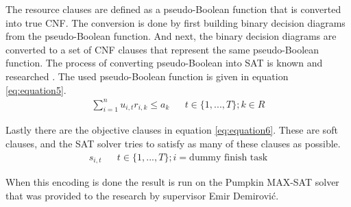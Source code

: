 The resource clauses are defined as a pseudo-Boolean function that is converted into true CNF. The conversion is done by first building binary decision diagrams from the pseudo-Boolean function. And next, the binary decision diagrams are converted to a set of CNF clauses that represent the same pseudo-Boolean function. The process of converting pseudo-Boolean into SAT is known and researched \cite{RN38}. The used pseudo-Boolean function is given in equation \ref{eq:equation5}.
\begin{align}\label{eq:equation5}
\sum^n_{i=1} u_{i,t}r_{i,k} \leq a_k    &&  t\in \{1,...,T\}; k\in R
\end{align}

Lastly there are the objective clauses in equation \ref{eq:equation6}. These are soft clauses, and the SAT solver tries to satisfy as many of these clauses as possible.
\begin{align}\label{eq:equation6}
s_{i,t} &&  t\in \{1,...,T\}; i = \text{dummy finish task}
\end{align}

When this encoding is done the result is run on the Pumpkin MAX-SAT solver that was provided to the research by supervisor Emir Demirović.

